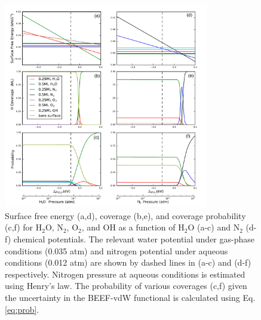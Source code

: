 \documentclass[journal=ascecg,manuscript=article,articletitle=true]{achemso}
\begin{document}
\begin{figure}
\centering
\includegraphics[width=0.8\textwidth]{figures/surface_phase_diagrams}

\caption{Surface free energy (a,d), coverage (b,e), and coverage probability (c,f) for H$_2$O, N$_2$, O$_2$, and OH as a function of H$_2$O (a-c) and N$_2$ (d-f) chemical potentials. The relevant water potential under gas-phase conditions (0.035 atm) and nitrogen potential under aqueous conditions (0.012 atm) are shown by dashed lines in (a-c) and (d-f) respectively. Nitrogen pressure at aqueous conditions is estimated using Henry's law. The probability of various coverages (c,f) given the uncertainty in the BEEF-vdW functional is calculated using Eq. \ref{eq:prob}.}
\label{fig:surface_diagram}
\end{figure}
\end{document}
